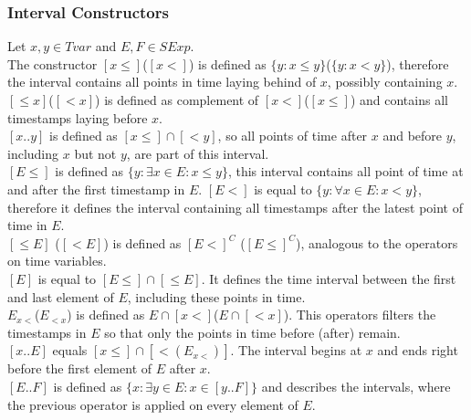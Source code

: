 	\subsubsection{Interval Constructors}
		Let $x, y\in Tvar$ and $E, F\in SExp$.\\
		The constructor $[x\leq]$($[x<]$) is defined as $\{y: x \leq y\}$($\{y: x < y\}$), therefore the interval contains all points in time laying behind of $x$, possibly containing $x$.\\
		$[\leq x]$($[< x]$) is defined as complement of $[x<]$($[x\leq]$) and contains all timestamps laying before $x$.\\
		$[x..y]$ is defined as $[x\leq]\cap[<y]$, so all points of time after $x$ and before $y$, including $x$ but not $y$, are part of this interval.\\
		$[E \leq]$ is defined as $\{y : \exists x \in E : x \leq y\}$, this interval contains all point of time at and after the first timestamp in $E$. $[E<]$ is equal to $\{y : \forall x \in E : x < y\}$, therefore it defines the interval containing all timestamps after the latest point of time in $E$.\\
		$[\leq E]$ ($[< E]$) is defined as $[E<]^C$ ($[E\leq]^C$), analogous to the operators on time variables.\\
		$[E]$ is equal to $[E\leq]\cap[\leq E]$. It defines the time interval between the first and last element of $E$, including these points in time.\\
		$E_{x<}$($E_{<x}$) is defined as $E\cap [x<]$($E\cap [<x]$). This operators filters the timestamps in $E$ so that only the points in time before (after) remain.\\
		$[x..E]$ equals $[x\leq]\cap[<(E_{x<})]$. The interval begins at $x$ and ends right before the first element of $E$ after $x$.\\
		$[E..F]$ is defined as $\{x:\exists y\in E:x\in[y..F]\}$ and describes the intervals, where the previous operator is applied on every element of $E$.\\
